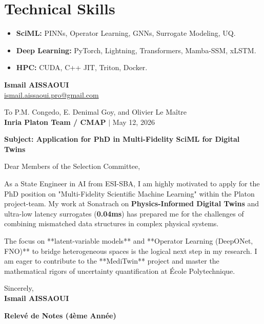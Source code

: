 \documentclass[a4paper,11pt]{article}
\begin{document}
\section{Technical Skills}
\begin{itemize}
    \item \textbf{SciML:} PINNs, Operator Learning, GNNs, Surrogate Modeling, UQ.
    \item \textbf{Deep Learning:} PyTorch, Lightning, Transformers, Mamba-SSM, xLSTM.
    \item \textbf{HPC:} CUDA, C++ JIT, Triton, Docker.
\end{itemize}

\newpage

\begin{flushleft}
    \textbf{Ismail AISSAOUI} \\
    \href{mailto:ismail.aissaoui.pro@gmail.com}{ismail.aissaoui.pro@gmail.com}
\end{flushleft}

\begin{flushright}
    To P.M. Congedo, E. Denimal Goy, and Olivier Le Maître \\
    \textbf{Inria Platon Team / CMAP} $|$ May 12, 2026
\end{flushright}

\bigskip
\noindent \textbf{Subject: Application for PhD in Multi-Fidelity SciML for Digital Twins}
\bigskip

Dear Members of the Selection Committee,

As a State Engineer in AI from ESI-SBA, I am highly motivated to apply for the PhD position on "Multi-Fidelity Scientific Machine Learning" within the Platon project-team. My work at Sonatrach on \textbf{Physics-Informed Digital Twins} and ultra-low latency surrogates (\textbf{0.04ms}) has prepared me for the challenges of combining mismatched data structures in complex physical systems.

The focus on **latent-variable models** and **Operator Learning (DeepONet, FNO)** to bridge heterogeneous spaces is the logical next step in my research. I am eager to contribute to the **MediTwin** project and master the mathematical rigors of uncertainty quantification at École Polytechnique.

\bigskip
Sincerely, \\
\textbf{Ismail AISSAOUI}

\newpage

\begin{center}
    {\Large\bfseries Relevé de Notes (4ème Année)}\\[20pt]
\end{center}


\end{document}
